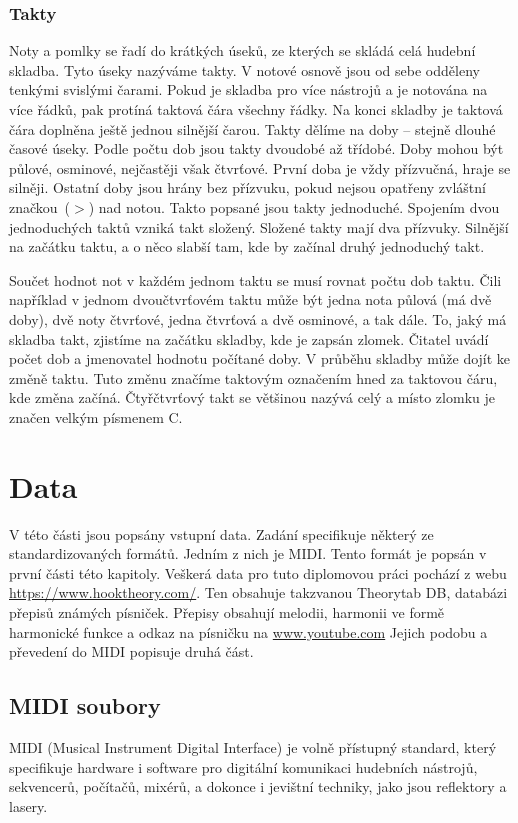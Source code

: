 \subsection{Takty}
Noty a pomlky se řadí do krátkých úseků, 
ze kterých se skládá celá hudební skladba.
Tyto úseky nazýváme takty.
V notové osnově jsou od sebe odděleny tenkými svislými čarami.
Pokud je skladba pro více nástrojů a je notována na více řádků, 
pak protíná taktová čára všechny řádky.
Na konci skladby je taktová čára doplněna ještě jednou silnější čarou. 
Takty dělíme na doby -- stejně dlouhé časové úseky.
Podle počtu dob jsou takty dvoudobé až třídobé.
Doby mohou být půlové, osminové, nejčastěji však čtvrťové.
První doba je vždy přízvučná, hraje se silněji.
Ostatní doby jsou hrány bez přízvuku, 
pokud nejsou opatřeny zvláštní značkou~($>$) nad notou.
Takto popsané jsou takty jednoduché.
Spojením dvou jednoduchých taktů vzniká takt složený.
Složené takty mají dva přízvuky.
Silnější na začátku taktu, a o něco slabší tam, 
kde by začínal druhý jednoduchý takt.
\par

Součet hodnot not v každém jednom taktu se musí rovnat počtu dob taktu.
Čili například v jednom  dvoučtvrťovém taktu 
může být jedna nota půlová (má dvě doby), 
dvě noty čtvrťové, jedna čtvrťová a dvě osminové, a tak dále.
To, jaký má skladba takt, zjistíme na začátku skladby, kde je zapsán zlomek.
Čitatel uvádí počet dob a jmenovatel hodnotu počítané doby.
V průběhu skladby může dojít ke změně taktu.
Tuto změnu značíme taktovým označením hned za taktovou čáru, 
kde změna začíná.
Čtyřčtvrťový takt se většinou nazývá celý 
a místo zlomku je značen velkým písmenem C.
\cite{cmiral,zenkl}

\chapter{Data}
V této části jsou popsány vstupní data.
Zadání specifikuje některý ze standardizovaných formátů.
Jedním z nich je MIDI.
Tento formát je popsán v první části této kapitoly.
Veškerá data pro tuto diplomovou práci pochází z webu \url{https://www.hooktheory.com/}.
Ten obsahuje takzvanou Theorytab DB, databázi přepisů známých písniček.
Přepisy obsahují melodii, harmonii ve formě harmonické funkce a odkaz na písničku na \url{www.youtube.com}
Jejich podobu a převedení do MIDI popisuje druhá část.

\section{MIDI soubory}
MIDI (Musical Instrument Digital Interface) je volně přístupný standard,
který specifikuje hardware i software 
pro digitální komunikaci hudebních nástrojů,
sekvencerů, počítačů, mixérů, 
a dokonce i jevištní techniky, jako jsou reflektory a lasery.
\cite{MIDI_tutorials}
\par

